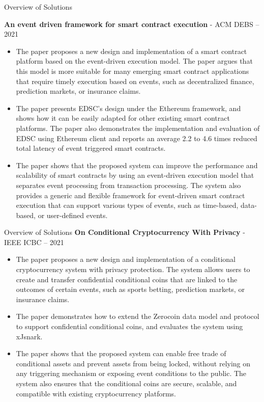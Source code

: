 \documentclass[10pt,aspectratio=169]{beamer}
\begin{document}
\begin{frame}{Overview of Solutions}

\textbf {An event driven framework for smart contract execution} - {ACM DEBS} -- {2021}
\begin{itemize} \item The paper proposes a new design and implementation of a smart contract platform based on the event-driven execution model. The paper argues that this model is more suitable for many emerging smart contract applications that require timely execution based on events, such as decentralized finance, prediction markets, or insurance claims. \item The paper presents EDSC’s design under the Ethereum framework, and shows how it can be easily adapted for other existing smart contract platforms. The paper also demonstrates the implementation and evaluation of EDSC using Ethereum client and reports an average 2.2 to 4.6 times reduced total latency of event triggered smart contracts. \item The paper shows that the proposed system can improve the performance and scalability of smart contracts by using an event-driven execution model that separates event processing from transaction processing. The system also provides a generic and flexible framework for event-driven smart contract execution that can support various types of events, such as time-based, data-based, or user-defined events. \end{itemize}
\end{frame}

\begin{frame}{Overview of Solutions}
\textbf {On Conditional Cryptocurrency With Privacy} - {IEEE ICBC} -- {2021}
\begin{itemize} \item The paper proposes a new design and implementation of a conditional cryptocurrency system with privacy protection. The system allows users to create and transfer confidential conditional coins that are linked to the outcomes of certain events, such as sports betting, prediction markets, or insurance claims. \item The paper demonstrates how to extend the Zerocoin data model and protocol to support confidential conditional coins, and evaluates the system using xJsnark. \item The paper shows that the proposed system can enable free trade of conditional assets and prevent assets from being locked, without relying on any triggering mechanism or exposing event conditions to the public. The system also ensures that the conditional coins are secure, scalable, and compatible with existing cryptocurrency platforms. \end{itemize}
\end{frame}
\end{document}
